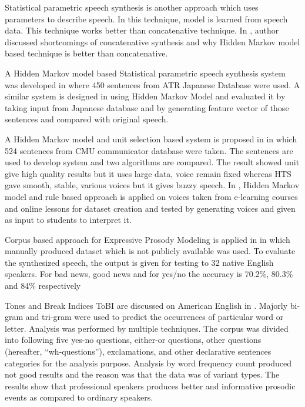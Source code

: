 Statistical parametric speech synthesis is another approach which uses parameters to describe
speech. In this technique, model is learned from speech data. This technique works better than
concatenative technique. In \cite{merritt2013investigating}, author discussed shortcomings of concatenative
synthesis and why Hidden Markov model based technique is better than concatenative.

A Hidden Markov model based Statistical parametric speech synthesis system was developed in
\cite{yoshimura1998duration} where 450 sentences from ATR Japanese Database were used.  A similar system is designed in 
\cite{tokuda2000speech} using Hidden Markov Model and evaluated it by taking input
from Japanese database and by generating feature vector of those sentences and compared with
original speech.


A Hidden Markov model and unit selection based system is proposed in \cite{tokuda2002hmm} in which
524 sentences from CMU communicator database were taken. The sentences are used to develop
system and two algorithms are compared. The result showed unit give high quality results but it
uses large data, voice remain fixed whereas HTS gave smooth, stable, various voices but it gives
buzzy speech. In \cite{harashima2006review}, Hidden Markov model and rule based approach is applied 
on voices taken from e-learning courses and online lessons for dataset creation and tested by
generating voices and given as input to students to interpret it.


Corpus based approach for Expressive Prosody Modeling is applied in \cite{eide2004corpus} in which
manually produced dataset which is not publicly available was used. To evaluate the synthesized
speech, the output is given for testing to 32 native English speakers. For bad news, good news and
for yes/no the accuracy is 70.2\%, 80.3\% and 84\% respectively


Tones and Break Indices ToBI are discussed on American English in \cite{pitrelli2004tobi}. Majorly
bi-gram and tri-gram were used to predict the occurrences of particular word or letter. Analysis
was performed by multiple techniques. The corpus was divided into following five yes-no
questions, either-or questions, other questions (hereafter, “wh-questions”), exclamations, and other
declarative sentences categories for the analysis purpose. Analysis by word frequency count
produced not good results and the reason was that the data was of variant types. The results show
that professional speakers produces better and informative prosodic events as compared to
ordinary speakers.

